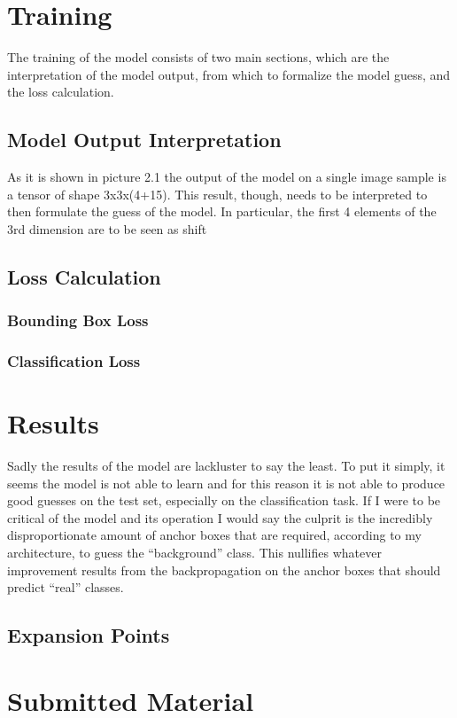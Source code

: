 \documentclass{article}
\begin{document}
\section{Training}

The training of the model consists of two main sections, which are the interpretation of the model output, from which to formalize the model guess, and the loss calculation. 
    \subsection{Model Output Interpretation}
    As it is shown in picture 2.1 the output of the model on a single image sample is a tensor of shape 3x3x(4+15). This result, though, needs to be interpreted to then formulate the guess of the model. In particular,  the first 4 elements of the 3rd dimension are to be seen as shift

    \subsection{Loss Calculation}

        \subsubsection{Bounding Box Loss}

        \subsubsection{Classification Loss}

\section{Results}

Sadly the results of the model are lackluster to say the least. To put it simply, it seems the model is not able to learn and for this reason it is not able to produce good guesses on the test set, especially on the classification task. If I were to be critical of the model and its operation I would say the culprit is the incredibly disproportionate amount of anchor boxes that are required, according to my architecture, to guess the “background” class. This nullifies whatever improvement results from the backpropagation on the anchor boxes that should predict “real” classes.

    \subsection{Expansion Points}

\section{Submitted Material}
\end{document}

